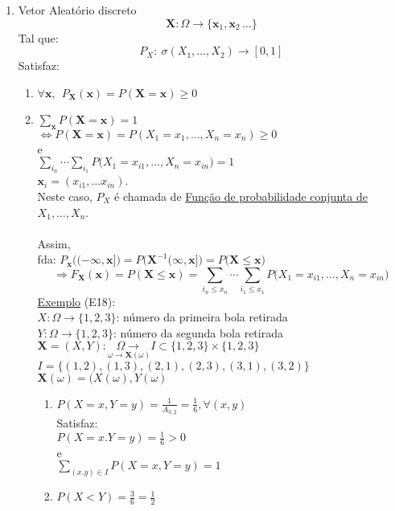 \documentclass[a4paper,12pt]{article}
\begin{document}
\begin{enumerate}
	\item Vetor Aleatório discreto
	$$\bm X:\Omega  \longrightarrow\{\bm x_1,\bm x_2\,\ldots \} $$
	Tal que:
	$$P_X: \ \sigma(X_1,\ldots, X_2) \longrightarrow[0,1]$$
	Satisfaz:
	\begin{enumerate}[label=\roman*)]
		\item $\forall \bm x,  \ \ P_{\bm X}(\bm x)= P(\bm X = \bm x)\ge 0 $
		\item $\sum\limits_{\bm x}P(\bm X = \bm x)=1$ \\
		$\Leftrightarrow  P(\bm X=\bm x)=P(X_1=x_1,\ldots,X_n=x_n)\ge 0  $\\
		e\\
	 $\sum\limits_{i_n}\cdots \sum\limits_{i_1}P\bigg(X_1=x_{i1},\ldots,X_n=x_{in}\bigg)=1$\\
	 $\bm x_i=(x_{i1},\ldots x_{in})$.\\
	  Neste caso, $P_X$ é chamada de \underline{Função de probabilidade conjunta de}
	 $X_1,\ldots,X_n $.\\
	 \\
	 Assim,\\
	 fda: $P_{\bm x}\bigg((-\infty,\bm x]\bigg) = P\bigg(\bm X^{-1}(\infty,\bm x]  \bigg)=P\bigg( \bm X\le \bm x\bigg)$\\
	 $$\Rightarrow F_{\bm X}(\bm x) = P(\bm X\le \bm x)= \sum\limits_{i_n\le x_n}\cdots \sum\limits_{i_1\le x_1}
	 P\bigg(X_1=x_{i1},\ldots,X_n=x_{in}\bigg)
	  $$
	  \underline{Exemplo} (E18):\\
	  $X:\Omega \rightarrow \{1,2,3\} $: número da primeira bola retirada\\
	  $Y:\Omega \rightarrow \{1,2,3\} $: número da segunda bola retirada\\
	  $\bm X = (X,Y): \underset{\omega \longrightarrow \bm X(\omega)}{\Omega \longrightarrow} I \subset \{1,2,3\}\times \{1,2,3\}$\\
	  $I=\bigg\{(1,2),(1,3),(2,1),(2,3),(3,1),(3,2)   \bigg\}$
	  \\
	  $\bm X(\omega)=(X(\omega),Y(\omega) $\\
	  \begin{enumerate}[label=\alph*)]
	  	\item $P(X=x,Y=y)=\frac{1}{A_{3,2}}=\frac{1}{6},\forall(x,y)$\\
	  	Satisfaz:\\
	  	$P(X=x.Y=y)=\frac{1}{6}>0$\\
	  	e\\
	  	$\sum\limits_{(x.y)\in I}P(X=x,Y=y)=1$
	  	\item $P(X<Y)=\frac{3}{6}=\frac{1}{2}$
	  \end{enumerate}
	  

\end{enumerate}
\end{enumerate}
\end{document}
